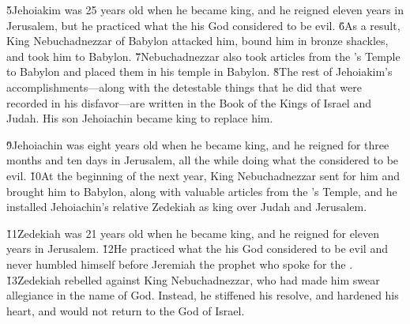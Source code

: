 \v{5}Jehoiakim was 25 years old when he became king, and he reigned eleven years in Jerusalem, but he practiced what the  his God considered to be evil. \v{6}As a result, King Nebuchadnezzar of Babylon attacked him, bound him in bronze shackles, and took him to Babylon. \v{7}Nebuchadnezzar also took articles from the 's Temple to Babylon and placed them in his temple in Babylon. \v{8}The rest of Jehoiakim's accomplishments---along with the detestable things that he did that were recorded in his disfavor---are written in the Book of the Kings of Israel and Judah. His son Jehoiachin became king to replace him.

\v{9}Jehoiachin was eight years old when he became king, and he reigned for three months and ten days in Jerusalem, all the while doing what the  considered to be evil. \v{10}At the beginning of the next year, King Nebuchadnezzar sent for him and brought him to Babylon, along with valuable articles from the 's Temple, and he installed Jehoiachin's relative Zedekiah as king over Judah and Jerusalem.

\v{11}Zedekiah was 21 years old when he became king, and he reigned for eleven years in Jerusalem. \v{12}He practiced what the  his God considered to be evil and never humbled himself before Jeremiah the prophet who spoke for the . \v{13}Zedekiah rebelled against King Nebuchadnezzar, who had made him swear allegiance in the name of God. Instead, he stiffened his resolve, and hardened his heart, and would not return to the  God of Israel.

